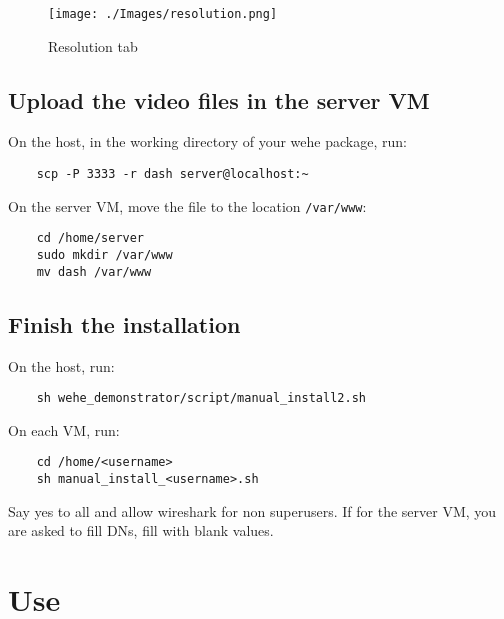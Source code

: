 \documentclass[11pt]{article}
\begin{document}
\begin{figure}[H]
    \centering
    \texttt{[image: ./Images/resolution.png]}
    \caption{Resolution tab}
    \label{fig:resolution}
\end{figure}


\subsection{Upload the video files in the server VM}
\label{sec:org9db713d}

On the host, in the working directory of your wehe package, run:

\begin{verbatim}
    scp -P 3333 -r dash server@localhost:~
\end{verbatim}

On the server VM, move the file to the location \texttt{/var/www}:
\begin{verbatim}
    cd /home/server
    sudo mkdir /var/www
    mv dash /var/www
\end{verbatim}


\subsection{Finish the installation}
\label{sec:orge04b516}

On the host, run:
\begin{verbatim}
    sh wehe_demonstrator/script/manual_install2.sh
\end{verbatim}

On each VM, run:
\begin{verbatim}
    cd /home/<username>
    sh manual_install_<username>.sh
\end{verbatim}

Say yes to all and allow wireshark for non superusers. If for the server VM, you are asked to fill DNs, fill with blank values.

\clearpage

\section{Use}
\label{sec:org12ef94c}
\end{document}
